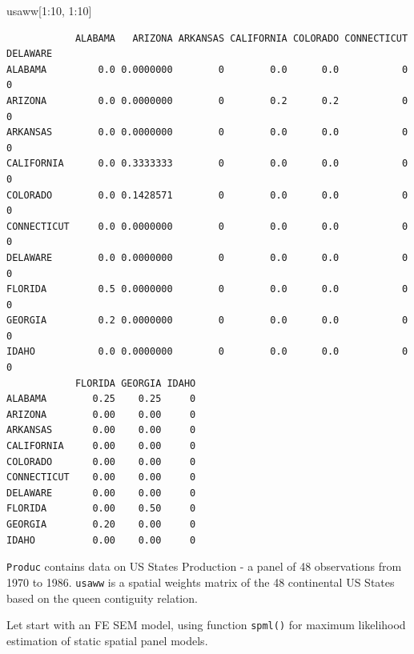 \documentclass[
  letterpaper,
  DIV=11,
  numbers=noendperiod]{scrreprt}
\newenvironment{Shaded}{\begin{snugshade}}{\end{snugshade}}
\newcommand{\DecValTok}[1]{\textcolor[rgb]{0.68,0.00,0.00}{#1}}
\newcommand{\NormalTok}[1]{\textcolor[rgb]{0.00,0.23,0.31}{#1}}
\newcommand{\SpecialCharTok}[1]{\textcolor[rgb]{0.37,0.37,0.37}{#1}}
\begin{document}
\begin{Shaded}
\begin{Highlighting}[]
\NormalTok{usaww[}\DecValTok{1}\SpecialCharTok{:}\DecValTok{10}\NormalTok{, }\DecValTok{1}\SpecialCharTok{:}\DecValTok{10}\NormalTok{]}
\end{Highlighting}
\end{Shaded}

\begin{verbatim}
            ALABAMA   ARIZONA ARKANSAS CALIFORNIA COLORADO CONNECTICUT DELAWARE
ALABAMA         0.0 0.0000000        0        0.0      0.0           0        0
ARIZONA         0.0 0.0000000        0        0.2      0.2           0        0
ARKANSAS        0.0 0.0000000        0        0.0      0.0           0        0
CALIFORNIA      0.0 0.3333333        0        0.0      0.0           0        0
COLORADO        0.0 0.1428571        0        0.0      0.0           0        0
CONNECTICUT     0.0 0.0000000        0        0.0      0.0           0        0
DELAWARE        0.0 0.0000000        0        0.0      0.0           0        0
FLORIDA         0.5 0.0000000        0        0.0      0.0           0        0
GEORGIA         0.2 0.0000000        0        0.0      0.0           0        0
IDAHO           0.0 0.0000000        0        0.0      0.0           0        0
            FLORIDA GEORGIA IDAHO
ALABAMA        0.25    0.25     0
ARIZONA        0.00    0.00     0
ARKANSAS       0.00    0.00     0
CALIFORNIA     0.00    0.00     0
COLORADO       0.00    0.00     0
CONNECTICUT    0.00    0.00     0
DELAWARE       0.00    0.00     0
FLORIDA        0.00    0.50     0
GEORGIA        0.20    0.00     0
IDAHO          0.00    0.00     0
\end{verbatim}

\texttt{Produc} contains data on US States Production - a panel of 48
observations from 1970 to 1986. \texttt{usaww} is a spatial weights
matrix of the 48 continental US States based on the queen contiguity
relation.

Let start with an FE SEM model, using function \texttt{spml()} for
maximum likelihood estimation of static spatial panel models.
\end{document}
